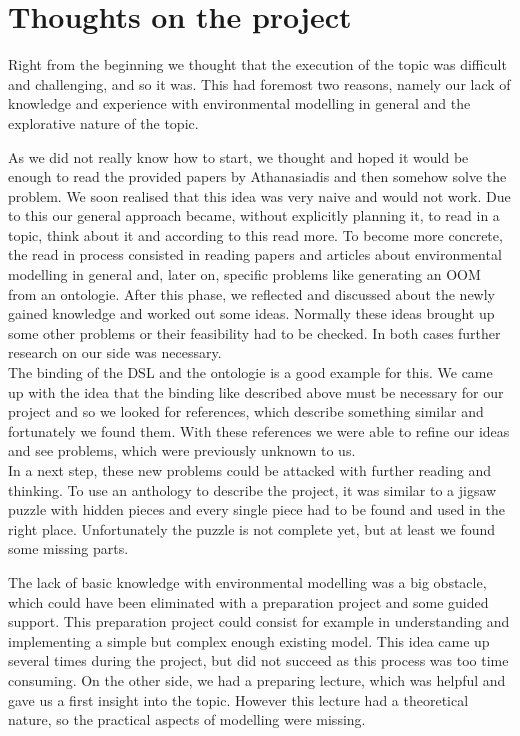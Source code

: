 \section{Thoughts on the project}
\par
Right from the beginning we thought that the execution of the topic was difficult and challenging, and so it was. This had foremost two reasons, namely our lack of knowledge and experience with environmental modelling in general and the explorative nature of the topic.
\par
As we did not really know how to start, we thought and hoped it would be enough to read the provided papers by Athanasiadis and then somehow solve the problem. We soon realised that this idea was very naive and would not work. Due to this our general approach became, without explicitly planning it, to read in a topic, think about it and according to this read more. To become more concrete, the read in process consisted in reading papers and articles about environmental modelling in general and, later on, specific problems like generating an OOM from an ontologie. After this phase, we reflected and discussed about the newly gained knowledge and worked out some ideas. Normally these ideas brought up some other problems or their feasibility had to be checked. In both cases further research on our side was necessary.\\
The binding of the DSL and the ontologie is a good example for this. We came up with the idea that the binding like described above must be necessary for our project and so we looked for references, which describe something similar and fortunately we found them. With these references we were able to refine our ideas and see problems, which were previously unknown to us.\\
In a next step, these new problems could be attacked with further reading and thinking.
To use an anthology to describe the project, it was similar to a jigsaw puzzle with hidden pieces and every single piece had to be found and used in the right place. Unfortunately the puzzle is not complete yet, but at least we found some missing parts.
\par
The lack of basic knowledge with environmental modelling was a big obstacle, which could have been eliminated with a preparation project and some guided support. This preparation project could consist for example in understanding and implementing a simple but complex enough existing model. This idea came up several times during the project, but did not succeed as this process was too time consuming. On the other side, we had a preparing lecture, which was helpful and gave us a first insight into the topic. However this lecture had a theoretical nature, so the practical aspects of modelling were missing.
